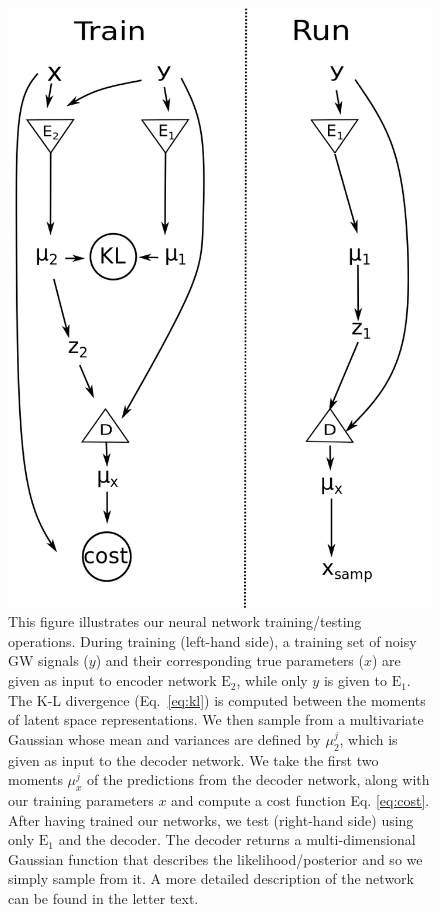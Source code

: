\documentclass[%
showpacs,
 amsmath,amssymb,
 aps,
 twocolumn,
 prl,
 reprint,
floatfix,
]{revtex4-1}
\begin{document}
\begin{figure}
    \includegraphics[width=\columnwidth]{images/network_setup.png}
    \caption{\label{fig:network_config} This figure illustrates our neural
network training/testing operations. During training (left-hand side), 
a training set of noisy
\ac{GW} signals ($y$) and their corresponding true parameters ($x$) are given
as input to encoder network $\textrm{E}_2$, while only $y$ is 
given to $\textrm{E}_1$. The K-L divergence (Eq.~\ref{eq:kl}) is computed
between the moments of latent space representations. We then sample from a
multivariate Gaussian whose mean and variances are defined by $\mu^{j}_{2}$, 
which is given as input to the decoder network. We take the first two
moments $\mu^{j}_x$ of the predictions from the decoder network, along with our
training parameters $x$ and compute a cost function Eq. \ref{eq:cost}. After
having trained our networks, we test (right-hand side) using only $\textrm{E}_1$ and the decoder.
The decoder returns a multi-dimensional Gaussian function that describes 
the likelihood/posterior and so we simply sample from it. A more 
detailed description of the network can be found in the letter text.} 
\end{figure}
\end{document}
